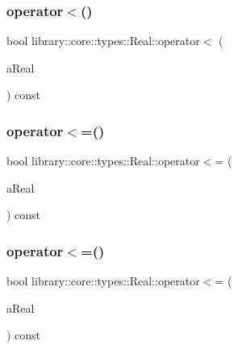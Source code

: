 \subsubsection{\texorpdfstring{operator$<$()}{operator<()}\hspace{0.1cm}{\footnotesize\ttfamily [2/2]}}
{\footnotesize\ttfamily bool library\+::core\+::types\+::\+Real\+::operator$<$ (\begin{DoxyParamCaption}\item[{const \hyperlink{classlibrary_1_1core_1_1types_1_1_real_a9c5c8826b7e5a8e39544d23fea6c0e1c}{Real\+::\+Value\+Type} \&}]{a\+Real }\end{DoxyParamCaption}) const}

\mbox{\label{classlibrary_1_1core_1_1types_1_1_real_af2b4d3909f7031f36908b10900b7bea7}} 
\subsubsection{\texorpdfstring{operator$<$=()}{operator<=()}\hspace{0.1cm}{\footnotesize\ttfamily [1/2]}}
{\footnotesize\ttfamily bool library\+::core\+::types\+::\+Real\+::operator$<$= (\begin{DoxyParamCaption}\item[{const \hyperlink{classlibrary_1_1core_1_1types_1_1_real}{Real} \&}]{a\+Real }\end{DoxyParamCaption}) const}

\mbox{\label{classlibrary_1_1core_1_1types_1_1_real_a75c87f91825d9d84cb1c44888bf33a38}} 
\subsubsection{\texorpdfstring{operator$<$=()}{operator<=()}\hspace{0.1cm}{\footnotesize\ttfamily [2/2]}}
{\footnotesize\ttfamily bool library\+::core\+::types\+::\+Real\+::operator$<$= (\begin{DoxyParamCaption}\item[{const \hyperlink{classlibrary_1_1core_1_1types_1_1_real_a9c5c8826b7e5a8e39544d23fea6c0e1c}{Real\+::\+Value\+Type} \&}]{a\+Real }\end{DoxyParamCaption}) const}

